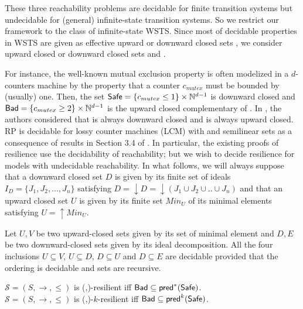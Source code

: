 
These three reachability problems are decidable for finite transition systems but undecidable for (general) infinite-state transition systems. 
So we restrict our framework to the class of infinite-state WSTS. Since most of decidable properties in WSTS are given as effective upward or downward closed sets \cite{DBLP:journals/iandc/AbdullaCJT00, DBLP:journals/tcs/FinkelS01}, we consider upward closed or downward closed sets \Safe and \Bad.

For instance, the well-known mutual exclusion property is often modelized in a $d$-counters machine by the property that a counter $c_{mutex}$ must be bounded by (usually) one. Then, the set $\textsf{Safe} =  \{c_{mutex} \leq 1\} \times \mathbb{N}^{d-1}$ is downward closed and $\textsf{Bad} =\{c_{mutex} \geq 2\} \times  \mathbb{N}^{d-1} $ is the upward closed complementary of \Safe. In \cite{DBLP:conf/gg/Ozkan22}, the authors considered that \Bad is always downward closed and \Safe is always upward closed.
%		
RP is decidable for lossy counter machines (LCM) with \Safe and \Bad semilinear sets as a consequence of results in Section 3.4 of \cite{DBLP:conf/rp/Schnoebelen10}. In particular, the existing proofs of resilience use the decidability of reachability; but we wish to decide resilience for models with undecidable reachability.
%
In what follows, we will always suppose that a downward closed set $D$ is given by its finite set of ideals $I_D=\{J_1, J_2,...,J_n\}$ satisfying $D=\downarrow D = \downarrow (J_1 \cup J_2 \cup..\cup J_n)$ and that an upward closed set $U$ is given by its finite set $Min_U$ of its minimal elements satisfying $U=\uparrow Min_U$.

Let $U,V$ be two upward-closed sets given by its set of minimal element and $D,E$ be two downward-closed sets given by its ideal decomposition. All the four  inclusions $U \subseteq V$,  $U \subseteq D$, $D \subseteq U$ and $D \subseteq E$ are decidable provided that the ordering is decidable and sets are recursive.
%


\begin{proposition}[Reformulation]\label{reformulation}
$\mathscr{S}=(S,\rightarrow,\leq)$ is %
(\Bad,\Safe)-resilient iff $\textsf{Bad} \subseteq \textsf{pred}^*(\textsf{Safe})$.\\
$\mathscr{S}=(S,\rightarrow,\leq)$ is %
(\Bad,\Safe)-$k$-resilient iff $\textsf{Bad} \subseteq \textsf{pred}^k(\textsf{Safe})$.
\end{proposition}

